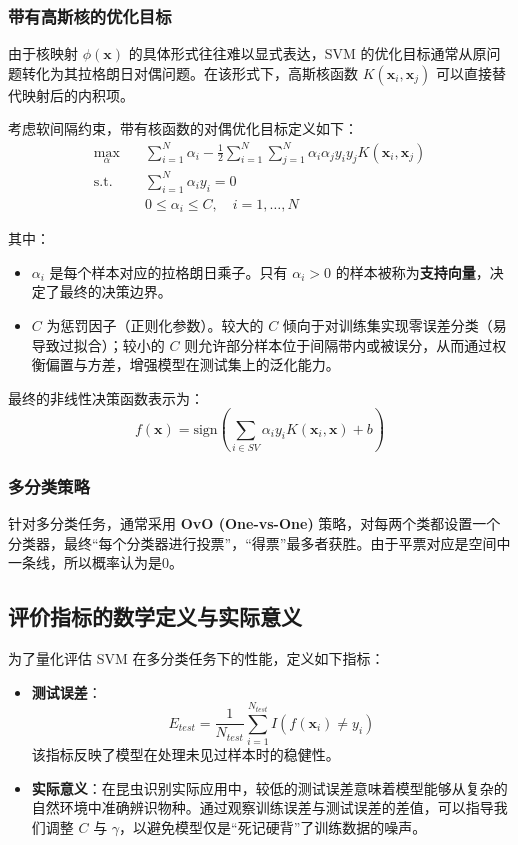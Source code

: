 \subsubsection{带有高斯核的优化目标}
由于核映射 $\phi(\mathbf{x})$ 的具体形式往往难以显式表达，SVM 的优化目标通常从原问题转化为其拉格朗日对偶问题。在该形式下，高斯核函数 $K(\mathbf{x}_i, \mathbf{x}_j)$ 可以直接替代映射后的内积项。

考虑软间隔约束，带有核函数的对偶优化目标定义如下：
\begin{align*}
	\max_{\alpha} \quad & \sum_{i=1}^{N} \alpha_i - \frac{1}{2} \sum_{i=1}^{N} \sum_{j=1}^{N} \alpha_i \alpha_j y_i y_j K(\mathbf{x}_i, \mathbf{x}_j) \\
	\text{s.t.} \quad & \sum_{i=1}^{N} \alpha_i y_i = 0 \\
	& 0 \leq \alpha_i \leq C, \quad i=1, \dots, N
\end{align*}

其中：
\begin{itemize}
	\item $\alpha_i$ 是每个样本对应的拉格朗日乘子。只有 $\alpha_i > 0$ 的样本被称为\textbf{支持向量}，决定了最终的决策边界。
	\item $C$ 为惩罚因子（正则化参数）。较大的 $C$ 倾向于对训练集实现零误差分类（易导致过拟合）；较小的 $C$ 则允许部分样本位于间隔带内或被误分，从而通过权衡偏置与方差，增强模型在测试集上的泛化能力。
\end{itemize}

最终的非线性决策函数表示为：
$$ f(\mathbf{x}) = \text{sign} \left( \sum_{i \in SV} \alpha_i y_i K(\mathbf{x}_i, \mathbf{x}) + b \right) $$

\subsubsection{多分类策略}
针对多分类任务，通常采用 \textbf{OvO (One-vs-One)} 策略，对每两个类都设置一个分类器，最终“每个分类器进行投票”，“得票”最多者获胜。由于平票对应是空间中一条线，所以概率认为是0。

\subsection{评价指标的数学定义与实际意义}
为了量化评估 SVM 在多分类任务下的性能，定义如下指标：
\begin{itemize}
	\item \textbf{测试误差}：
	$$ E_{test} = \frac{1}{N_{test}} \sum_{i=1}^{N_{test}} I\left( f(\mathbf{x}_i) \neq y_i \right) $$
	该指标反映了模型在处理未见过样本时的稳健性。
	\item \textbf{实际意义}：在昆虫识别实际应用中，较低的测试误差意味着模型能够从复杂的自然环境中准确辨识物种。通过观察训练误差与测试误差的差值，可以指导我们调整 $C$ 与 $\gamma$，以避免模型仅是“死记硬背”了训练数据的噪声。
\end{itemize}

